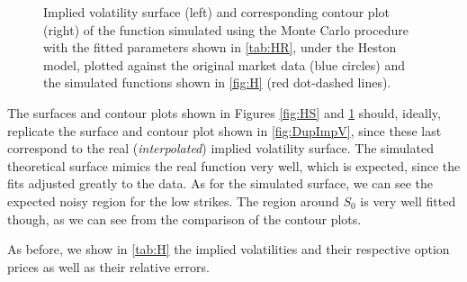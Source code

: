 \begin{figure}[H]
  \begin{subfigmatrix}{2}
  \end{subfigmatrix}
    \caption[Implied volatility surface and corresponding contour plot of the function simulated using the Monte Carlo procedure with the fitted parameters shown in \autoref{tab:HR}, under the Heston model, plotted against the original market data and the simulated functions shown in \autoref{fig:H}.]{Implied volatility surface (left) and corresponding contour plot (right) of the function simulated using the Monte Carlo procedure with the fitted parameters shown in \autoref{tab:HR}, under the Heston model, plotted against the original market data (blue circles) and the simulated functions shown in \autoref{fig:H} (red dot-dashed lines).}\label{fig:HSSim}
\end{figure} 


The surfaces and contour plots shown in Figures \ref{fig:HS} and \ref{fig:HSSim} should, ideally, replicate the surface and contour plot shown in \autoref{fig:DupImpV}, since these last correspond to the real (\emph{interpolated}) implied volatility surface. The simulated theoretical surface mimics the real function very well, which is expected, since the fits adjusted greatly to the data.
As for the simulated surface, we can see the expected noisy region for the low strikes. The region around $S_0$ is very well fitted though, as we can see from the comparison of the contour plots.

\vspace{\fill}
\newpage

As before, we show in \autoref{tab:H} the implied volatilities and their respective option prices as well as their relative errors.

